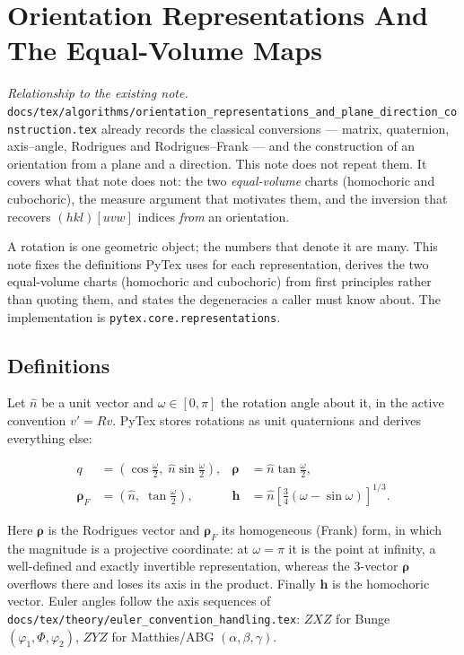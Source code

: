 \section{Orientation Representations And The Equal-Volume Maps}

\emph{Relationship to the existing note.}
\texttt{docs/tex/algorithms/orientation\_representations\_and\_plane\_direction\_construction.tex}
already records the classical conversions --- matrix, quaternion, axis--angle, Rodrigues and
Rodrigues--Frank --- and the construction of an orientation from a plane and a direction.
This note does not repeat them. It covers what that note does not: the two \emph{equal-volume}
charts (homochoric and cubochoric), the measure argument that motivates them, and the
inversion that recovers \((hkl)[uvw]\) indices \emph{from} an orientation.

A rotation is one geometric object; the numbers that denote it are many. This note fixes
the definitions PyTex uses for each representation, derives the two equal-volume charts
(homochoric and cubochoric) from first principles rather than quoting them, and states the
degeneracies a caller must know about. The implementation is
\texttt{pytex.core.representations}.

\subsection{Definitions}

Let \(\hat{n}\) be a unit vector and \(\omega \in [0,\pi]\) the rotation angle about it, in
the active convention \(v' = R v\). PyTex stores rotations as unit quaternions and derives
everything else:

\begin{align}
  q &= \left(\cos\tfrac{\omega}{2},\; \hat{n}\sin\tfrac{\omega}{2}\right), &
  \boldsymbol{\rho} &= \hat{n}\tan\tfrac{\omega}{2}, \\
  \boldsymbol{\rho}_{F} &= \left(\hat{n},\; \tan\tfrac{\omega}{2}\right), &
  \mathbf{h} &= \hat{n}\left[\tfrac{3}{4}\left(\omega - \sin\omega\right)\right]^{1/3}.
\end{align}

Here \(\boldsymbol{\rho}\) is the Rodrigues vector and \(\boldsymbol{\rho}_{F}\) its
homogeneous (Frank) form, in which the magnitude is a projective coordinate: at
\(\omega = \pi\) it is the point at infinity, a well-defined and exactly invertible
representation, whereas the 3-vector \(\boldsymbol{\rho}\) overflows there and loses its
axis in the product. Finally \(\mathbf{h}\) is the homochoric vector. Euler angles follow the axis sequences of
\texttt{docs/tex/theory/euler\_convention\_handling.tex}: \(ZXZ\) for Bunge
\((\varphi_1, \Phi, \varphi_2)\), \(ZYZ\) for Matthies/ABG \((\alpha, \beta, \gamma)\).

